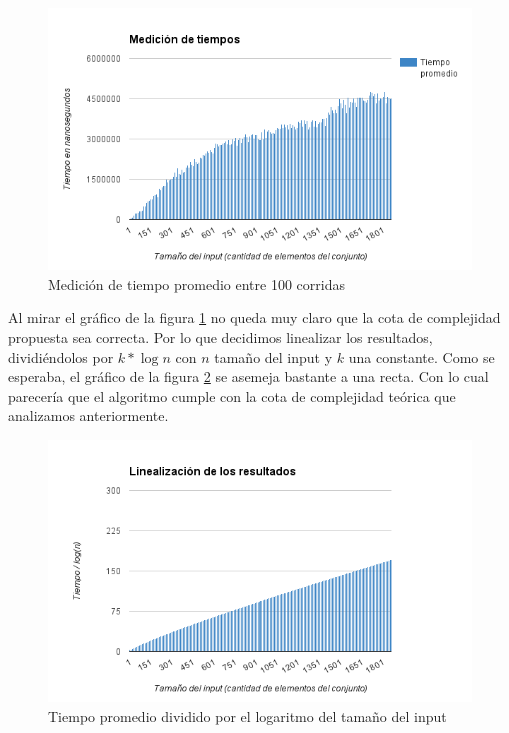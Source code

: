 \begin{figure}[h!]
	\centering
 	\includegraphics[scale=0.8]{imagenes/ej2/tiempos.png}
	\caption{Medición de tiempo promedio entre 100 corridas}
	\label{tiemposprom}
 \end{figure}

 Al mirar el gráfico de la figura \ref{tiemposprom} no queda muy claro que la cota de complejidad propuesta sea correcta. Por lo que decidimos linealizar los resultados, dividiéndolos por $k * \log{n}$ con $n$ tamaño del input y $k$ una constante. Como se esperaba, el gráfico de la figura \ref{tiempolineal} se asemeja bastante a una recta. Con lo cual parecería que el algoritmo cumple con la cota de complejidad teórica que analizamos anteriormente.

 \begin{figure}[h!]
 	\centering
 	\includegraphics[scale=0.8]{imagenes/ej2/linealizacion.png}
	\caption{Tiempo promedio dividido por el logaritmo del tamaño del input}
	\label{tiempolineal}
 \end{figure}


